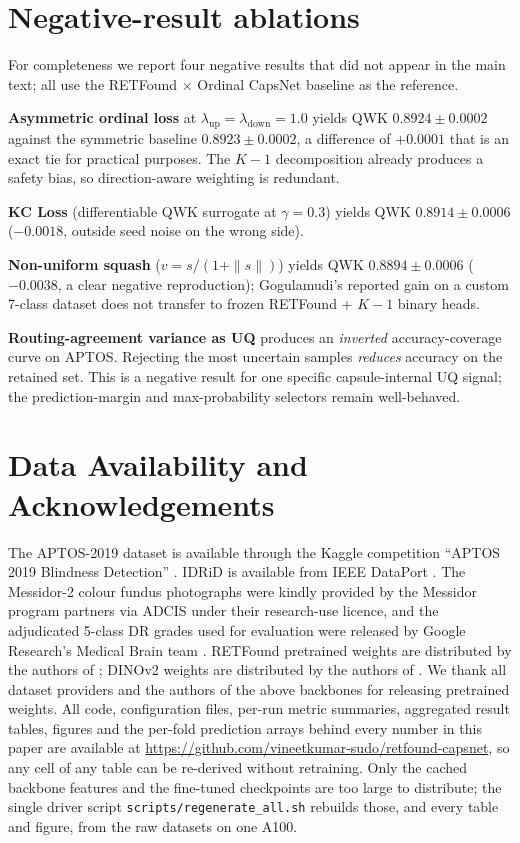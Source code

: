 \documentclass[journal]{IEEEtran}
\begin{document}
\appendices

\section{Negative-result ablations}
\label{sec:negatives}

For completeness we report four negative results that did not appear in the main text; all use the RETFound $\times$ Ordinal CapsNet baseline as the reference.

\textbf{Asymmetric ordinal loss} at $\lambda_{\text{up}}=\lambda_{\text{down}}=1.0$ yields QWK $0.8924 \pm 0.0002$ against the symmetric baseline $0.8923 \pm 0.0002$, a difference of $+0.0001$ that is an exact tie for practical purposes. The $K{-}1$ decomposition already produces a safety bias, so direction-aware weighting is redundant.

\textbf{KC Loss} (differentiable QWK surrogate at $\gamma = 0.3$) yields QWK $0.8914 \pm 0.0006$ ($-0.0018$, outside seed noise on the wrong side).

\textbf{Non-uniform squash} \cite{ref:gogulamudi} ($v = s / (1 + \|s\|)$) yields QWK $0.8894 \pm 0.0006$ ($-0.0038$, a clear negative reproduction); Gogulamudi's reported gain on a custom 7-class dataset does not transfer to frozen RETFound + $K{-}1$ binary heads.

\textbf{Routing-agreement variance as UQ} produces an \emph{inverted} accuracy-coverage curve on APTOS. Rejecting the most uncertain samples \emph{reduces} accuracy on the retained set. This is a negative result for one specific capsule-internal UQ signal; the prediction-margin and max-probability selectors remain well-behaved.

\section*{Data Availability and Acknowledgements}
The APTOS-2019 dataset is available through the Kaggle competition ``APTOS 2019 Blindness Detection'' \cite{ref:aptos}. IDRiD is available from IEEE DataPort \cite{ref:idrid}. The Messidor-2 colour fundus photographs were kindly provided by the Messidor program partners via ADCIS under their research-use licence, and the adjudicated 5-class DR grades used for evaluation were released by Google Research's Medical Brain team \cite{ref:messidor2,ref:abramoff}. RETFound pretrained weights are distributed by the authors of \cite{ref:retfound}; DINOv2 weights are distributed by the authors of \cite{ref:dinov2}. We thank all dataset providers and the authors of the above backbones for releasing pretrained weights. All code, configuration files, per-run metric summaries, aggregated result tables, figures and the per-fold prediction arrays behind every number in this paper are available at \url{https://github.com/vineetkumar-sudo/retfound-capsnet}, so any cell of any table can be re-derived without retraining. Only the cached backbone features and the fine-tuned checkpoints are too large to distribute; the single driver script \texttt{scripts/regenerate\_all.sh} rebuilds those, and every table and figure, from the raw datasets on one A100.
\end{document}
